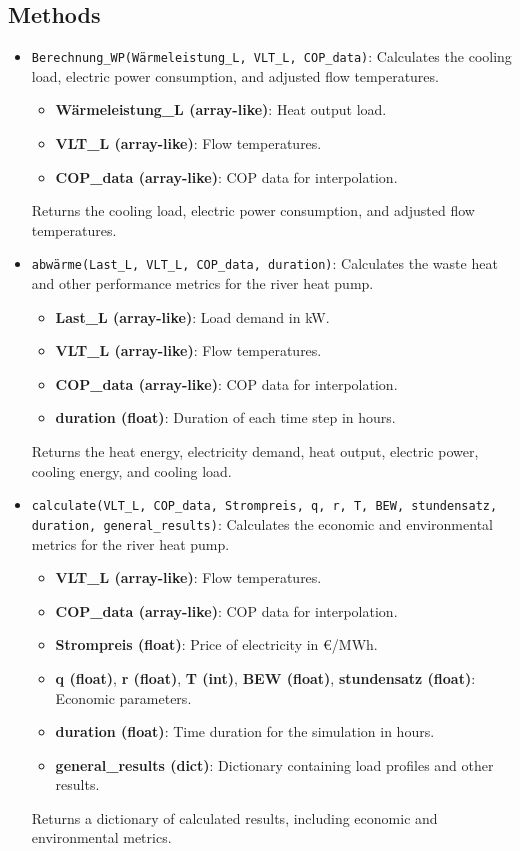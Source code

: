 \subsection{Methods}
\begin{itemize}
    \item \texttt{Berechnung\_WP(Wärmeleistung\_L, VLT\_L, COP\_data)}: Calculates the cooling load, electric power consumption, and adjusted flow temperatures.
    \begin{itemize}
        \item \textbf{Wärmeleistung\_L (array-like)}: Heat output load.
        \item \textbf{VLT\_L (array-like)}: Flow temperatures.
        \item \textbf{COP\_data (array-like)}: COP data for interpolation.
    \end{itemize}
    Returns the cooling load, electric power consumption, and adjusted flow temperatures.

    \item \texttt{abwärme(Last\_L, VLT\_L, COP\_data, duration)}: Calculates the waste heat and other performance metrics for the river heat pump.
    \begin{itemize}
        \item \textbf{Last\_L (array-like)}: Load demand in kW.
        \item \textbf{VLT\_L (array-like)}: Flow temperatures.
        \item \textbf{COP\_data (array-like)}: COP data for interpolation.
        \item \textbf{duration (float)}: Duration of each time step in hours.
    \end{itemize}
    Returns the heat energy, electricity demand, heat output, electric power, cooling energy, and cooling load.

    \item \texttt{calculate(VLT\_L, COP\_data, Strompreis, q, r, T, BEW, stundensatz, duration, general\_results)}: Calculates the economic and environmental metrics for the river heat pump.
    \begin{itemize}
        \item \textbf{VLT\_L (array-like)}: Flow temperatures.
        \item \textbf{COP\_data (array-like)}: COP data for interpolation.
        \item \textbf{Strompreis (float)}: Price of electricity in €/MWh.
        \item \textbf{q (float)}, \textbf{r (float)}, \textbf{T (int)}, \textbf{BEW (float)}, \textbf{stundensatz (float)}: Economic parameters.
        \item \textbf{duration (float)}: Time duration for the simulation in hours.
        \item \textbf{general\_results (dict)}: Dictionary containing load profiles and other results.
    \end{itemize}
    Returns a dictionary of calculated results, including economic and environmental metrics.


\end{itemize}
